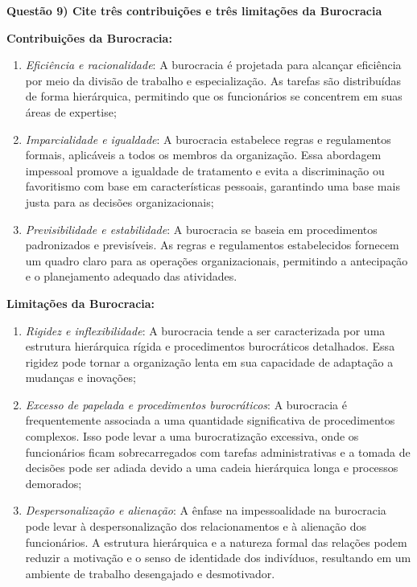 \documentclass[11pt]{article}
\begin{document}
\noindent \textbf{Questão 9) Cite três contribuições e três limitações da Burocracia}\par
\textbf{Contribuições da Burocracia:}
\begin{enumerate}
    \item \emph{Eficiência e racionalidade}: A burocracia é projetada para alcançar eficiência por meio da divisão de trabalho e especialização. As tarefas são distribuídas de forma hierárquica, permitindo que os funcionários se concentrem em suas áreas de expertise;
    \item \emph{Imparcialidade e igualdade}: A burocracia estabelece regras e regulamentos formais, aplicáveis a todos os membros da organização. Essa abordagem impessoal promove a igualdade de tratamento e evita a discriminação ou favoritismo com base em características pessoais, garantindo uma base mais justa para as decisões organizacionais;
    \item \emph{Previsibilidade e estabilidade}: A burocracia se baseia em procedimentos padronizados e previsíveis. As regras e regulamentos estabelecidos fornecem um quadro claro para as operações organizacionais, permitindo a antecipação e o planejamento adequado das atividades.
\end{enumerate}
\textbf{Limitações da Burocracia:}
\begin{enumerate}
    \item \emph{Rigidez e inflexibilidade}: A burocracia tende a ser caracterizada por uma estrutura hierárquica rígida e procedimentos burocráticos detalhados. Essa rigidez pode tornar a organização lenta em sua capacidade de adaptação a mudanças e inovações;
    \item \emph{Excesso de papelada e procedimentos burocráticos}: A burocracia é frequentemente associada a uma quantidade significativa de procedimentos complexos. Isso pode levar a uma burocratização excessiva, onde os funcionários ficam sobrecarregados com tarefas administrativas e a tomada de decisões pode ser adiada devido a uma cadeia hierárquica longa e processos demorados;
    \item \emph{Despersonalização e alienação}: A ênfase na impessoalidade na burocracia pode levar à despersonalização dos relacionamentos e à alienação dos funcionários. A estrutura hierárquica e a natureza formal das relações podem reduzir a motivação e o senso de identidade dos indivíduos, resultando em um ambiente de trabalho desengajado e desmotivador.
\end{enumerate}
\end{document}
